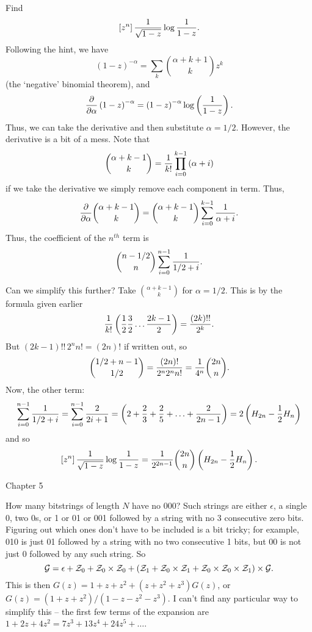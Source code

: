  Find
$$
 \left[z^n\right] {1 \over \sqrt{1 - z}} \log {1 \over 1 - z}.
$$
Following the hint, we
have
$$
 \left(1 - z\right)^{-\alpha} = \sum_k {\alpha + k + 1 \choose k} z^k
$$
(the `negative' binomial theorem), and
$$
 {\partial \over \partial \alpha} \left(1 - z \right)^{-\alpha}
  = \left(1 - z\right)^{-\alpha} \log \left({1 \over 1 - z}\right).
$$
Thus, we can take the derivative and then substitute $\alpha = 1/2$.
However, the derivative is a bit of a mess.  Note that
$$
  {\alpha + k - 1 \choose k} = {1 \over k!} \prod_{i=0}^{k-1} \left(\alpha + i\right)
$$
if we take the derivative we simply remove each component in term.  Thus,
$$
 {\partial \over \partial \alpha} {\alpha + k - 1 \choose k} =
  {\alpha + k - 1 \choose k} \sum_{i=0}^{k-1} {1 \over \alpha + i}.
$$
Thus, the coefficient of the $n^{th}$ term is
$$
 {n - 1/2 \choose n} \sum_{i=0}^{n-1} {1 \over 1/2 + i}.
$$

Can we simplify this further?  Take $\alpha + k - 1 \choose k$ for $\alpha = 1/2$.
This is by the formula given earlier 
$$
 {1 \over k!} \left({1 \over 2} {3 \over 2} \ldots {2k - 1 \over 2}\right) =
  {\left(2k\right)!! \over 2^k}.
$$
But $\left(2k - 1\right)!! \, 2^n n! = \left(2 n\right)!$ if written out,
so
$$
 {1/2 + n - 1 \choose 1/2} = {\left(2 n\right)! \over 2^n 2^n n!} = {1 \over 4^n} {2n \choose n}.
$$
Now, the other term:
$$
 \sum_{i=0}^{n-1} {1 \over 1/2 + i} = \sum_{i=0}^{n-1} {2 \over 2 i + 1}
  = \left(2 + {2 \over 3} + {2 \over 5} + \ldots + {2 \over 2 n - 1}\right)
  = 2 \left(H_{2n} - {1 \over 2} H_n\right)
$$
and so
$$
 \left[z^n\right] {1 \over \sqrt{1 - z}} \log {1 \over 1 - z} =
  {1 \over 2^{2n-1}} {2n \choose n} \left(H_{2n} - {1 \over 2} H_n\right).
$$

\vskip 0.3in
\centerline {Chapter 5}
\vskip 0.2in

 How many bitstrings of
length $N$ have no 000?\hfil\break
Such strings are either $\epsilon$, a single 0, two 0s, or 1 or 01 or 001 followed
by a string with no 3 consecutive zero bits.  Figuring out which ones
don't have to be included is a bit tricky; for example, 010 is just 01 followed
by a string with no two consecutive 1 bits, but 00 is not just 0 followed
by any such string.  So
$$
 {\cal G} = \epsilon + {\cal Z}_0 + {\cal Z}_0 \times {\cal Z}_0
   + \left({\cal Z}_1 + {\cal Z}_0 \times {\cal Z}_1 
   + {\cal Z}_0 \times {\cal Z}_0 \times {\cal Z}_1\right) \times {\cal G}.
$$
This is then $G\left(z\right) = 1 + z + z^2 + \left(z + z^2 + z^3\right) G\left(z\right)$,
or $G\left(z\right) = \left(1 + z + z^2\right) / \left(1 - z - z^2 - z^3\right)$.  I can't
find any particular way to simplify this -- the first few terms of the expansion
are $1 + 2z + 4z^2 = 7z^3 + 13z^4 + 24z^5 + \ldots$.


